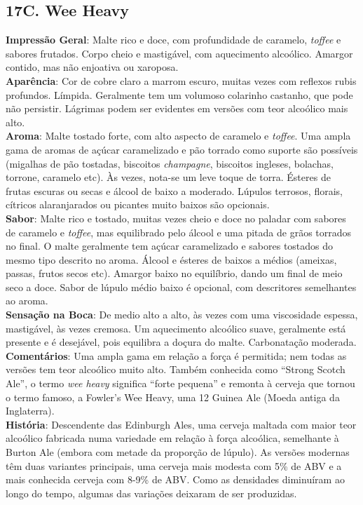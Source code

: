 \subsection*{17C. Wee Heavy}
\textbf{Impressão Geral}: Malte rico e doce, com profundidade de caramelo, \textit{toffee} e sabores frutados. Corpo cheio e mastigável, com aquecimento alcoólico. Amargor contido, mas não enjoativa ou xaroposa. \\
\textbf{Aparência}: Cor de cobre claro a marrom escuro, muitas vezes com reflexos rubis profundos. Límpida. Geralmente tem um volumoso colarinho castanho, que pode não persistir. Lágrimas podem ser evidentes em versões com teor alcoólico mais alto. \\
\textbf{Aroma}: Malte tostado forte, com alto aspecto de caramelo e \textit{toffee}. Uma ampla gama de aromas de açúcar caramelizado e pão torrado como suporte são possíveis (migalhas de pão tostadas, biscoitos \textit{champagne}, biscoitos ingleses, bolachas, torrone, caramelo etc). Às vezes, nota-se um leve toque de torra. Ésteres de frutas escuras ou secas e álcool de baixo a moderado. Lúpulos terrosos, florais, cítricos alaranjarados ou picantes muito baixos são opcionais. \\
\textbf{Sabor}: Malte rico e tostado, muitas vezes cheio e doce no paladar com sabores de caramelo e \textit{toffee}, mas equilibrado pelo álcool e uma pitada de grãos torrados no final. O malte geralmente tem açúcar caramelizado e sabores tostados do mesmo tipo descrito no aroma. Álcool e ésteres de baixos a médios (ameixas, passas, frutos secos etc). Amargor baixo no equilíbrio, dando um final de meio seco a doce. Sabor de lúpulo médio baixo é opcional, com descritores semelhantes ao aroma. \\
\textbf{Sensação na Boca}: De medio alto a alto, às vezes com uma viscosidade espessa, mastigável, às vezes cremosa. Um aquecimento alcoólico suave, geralmente está presente e é desejável, pois equilibra a doçura do malte. Carbonatação moderada. \\
\textbf{Comentários}: Uma ampla gama em relação a força é permitida; nem todas as versões tem teor alcoólico muito alto. Também conhecida como “Strong Scotch Ale”, o termo \textit{wee heavy} significa “forte pequena” e remonta à cerveja que tornou o termo famoso, a Fowler’s Wee Heavy, uma 12 Guinea Ale (Moeda antiga da Inglaterra). \\
\textbf{História}: Descendente das Edinburgh Ales, uma cerveja maltada com maior teor alcoólico fabricada numa variedade em relação à força alcoólica, semelhante à Burton Ale (embora com metade da proporção de lúpulo). As versões modernas têm duas variantes principais, uma cerveja mais modesta com 5\% de ABV e a mais conhecida cerveja com 8-9\% de ABV. Como as densidades diminuíram ao longo do tempo, algumas das variações deixaram de ser produzidas. \\

